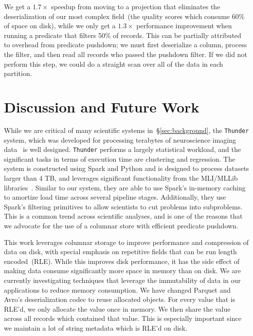 \documentclass{acm_proc_article-sp}
\begin{document}
We get a $1.7\times$ speedup from moving to a projection that eliminates the deserialization of our most
complex field~(the quality scores which consume 60\% of space on disk), while we only get a $1.3\times$
performance improvement when running a predicate that filters 50\% of records. This can be partially attributed
to overhead from predicate pushdown; we must first deserialize a column, process the filter, and then read all
records who passed the pushdown filter. If we did not perform this step, we could do a straight scan over all of
the data in each partition.

\section{Discussion and Future Work}
\label{sec:discussion-future-work}

While we are critical of many scientific systems in~\S\ref{sec:background}, the \texttt{Thunder} system,
which was developed for processing terabytes of neuroscience imaging data~\cite{freeman14} is well
designed. \texttt{Thunder} performs a largely statistical workload, and the significant tasks in terms of
execution time are clustering and regression. The system is constructed using Spark and Python and is
designed to process datasets larger than 4 TB, and leverages significant functionality from the MLI/MLLib
libraries~\cite{sparks13}. Similar to our system, they are able to use Spark's in-memory caching to
amortize load time across several pipeline stages. Additionally, they use Spark's filtering primitives to
allow scientists to cut problems into subproblems. This is a common trend across scientific analyses, and
is one of the reasons that we advocate for the use of a columnar store with efficient predicate pushdown.

This work leverages columnar storage to improve performance and compression of data on disk,
with special emphasis on repetitive fields that can be run length encoded~(RLE). While this improves
disk performance, it has the side effect of making data consume significantly more space in memory
than on disk. We are currently investigating techniques that leverage the immutability of data in our
applications to reduce memory consumption. We have changed Parquet and Avro's deserialization codec
to reuse allocated objects. For every value that is RLE'd, we only allocate the value once in memory. We
then share the value across all records which contained that value. This is especially important since we
maintain a lot of string metadata which is RLE'd on disk.
\end{document}
